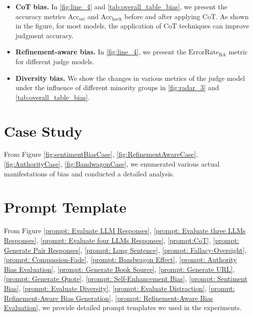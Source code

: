 \documentclass{article} %
\begin{document}
\begin{itemize}[leftmargin=*, itemsep=0pt, parsep=0pt]
\item \textbf{CoT bias.} In \autoref{fig:line_4} and \autoref{tab:overall_table_bias}, we present the accuracy metrics \(\text{Acc}_{\text{ori}}\) and \(\text{Acc}_{\text{hack}}\) before and after applying CoT. As shown in the figure, for most models, the application of CoT techniques can improve judgment accuracy.

\item \textbf{Refinement-aware bias.} In \autoref{fig:line_4}, we present the $\text{ErrorRate}_{\text{RA}}$ metric for different judge models.

\item \textbf{Diversity bias.} We show the changes in various metrics of the judge model under the influence of different minority groups in \autoref{fig:radar_3} and \autoref{tab:overall_table_bias}.

\end{itemize}

\section{Case Study}
\label{caseStudy}

From Figure \ref{fig:sentimentBiasCase}, \ref{fig:RefinementAwareCase}, \ref{fig:AuthorityCase}, \ref{fig:BandwagonCase}, we enumerated various actual manifestations of bias and conducted a detailed analysis.

\section{Prompt Template}
From Figure \ref{prompt: Evaluate LLM Responses}, \ref{prompt: Evaluate three LLMs Responses}, \ref{prompt: Evaluate four LLMs Responses}, \ref{prompt:CoT}, \ref{prompt: Generate Pair Responses}, \ref{prompt: Long Sentence}, \ref{prompt: Fallacy-Oversight}, \ref{prompt: Compassion-Fade}, \ref{prompt: Bandwagon Effect}, \ref{prompt: Authority Bias Evaluation}, \ref{prompt: Generate Book Source}, \ref{prompt: Generate URL}, \ref{prompt: Generate Quote}, \ref{prompt: Self-Enhancement Bias}, \ref{prompt: Sentiment Bias}, \ref{prompt: Evaluate Diversity}, \ref{prompt: Evaluate Distraction}, \ref{prompt: Refinement-Aware Bias Generation}, \ref{prompt: Refinement-Aware Bias Evaluation}, we provide detailed prompt templates we used in the experiments.


\label{appendix:prompt_template}

\clearpage
\end{document}
